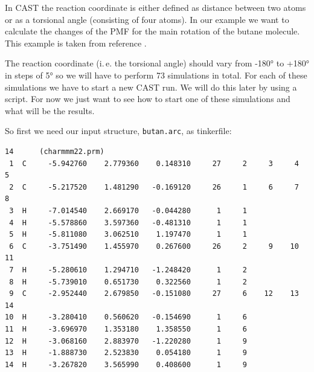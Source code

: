 \documentclass[a4paper,11pt]{scrartcl}
\begin{document}
In CAST the reaction coordinate is either defined as distance between two atoms or as a torsional angle (consisting of four atoms). In our example we want to calculate the changes of the PMF for the main rotation of the butane molecule. This example is taken from reference \cite{becker_development_2015}.

The reaction coordinate (i.\,e. the torsional angle) should vary from -180° to +180° in steps of 5° so we will have to perform 73 simulations in total. For each of these simulations we have to start a new CAST run. We will do this later by using a script. For now we just want to see how to start one of these simulations and what will be the results. 

So first we need our input structure, \texttt{butan.arc}, as tinkerfile:
\begin{lstlisting}[frame=single,]
14      (charmmm22.prm)
 1  C     -5.942760    2.779360    0.148310     27     2     3     4     5
 2  C     -5.217520    1.481290   -0.169120     26     1     6     7     8
 3  H     -7.014540    2.669170   -0.044280      1     1
 4  H     -5.578860    3.597360   -0.481310      1     1
 5  H     -5.811080    3.062510    1.197470      1     1
 6  C     -3.751490    1.455970    0.267600     26     2     9    10    11
 7  H     -5.280610    1.294710   -1.248420      1     2
 8  H     -5.739010    0.651730    0.322560      1     2
 9  C     -2.952440    2.679850   -0.151080     27     6    12    13    14
10  H     -3.280410    0.560620   -0.154690      1     6
11  H     -3.696970    1.353180    1.358550      1     6
12  H     -3.068160    2.883970   -1.220280      1     9
13  H     -1.888730    2.523830    0.054180      1     9
14  H     -3.267820    3.565990    0.408600      1     9
\end{lstlisting}
\end{document}
